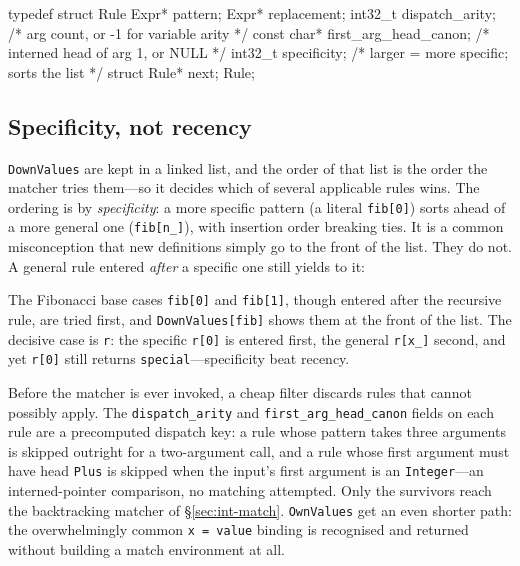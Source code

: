 \begin{ccode}
typedef struct Rule {
    Expr* pattern;
    Expr* replacement;
    int32_t     dispatch_arity;        /* arg count, or -1 for variable arity   */
    const char* first_arg_head_canon;  /* interned head of arg 1, or NULL        */
    int32_t     specificity;           /* larger = more specific; sorts the list */
    struct Rule* next;
} Rule;
\end{ccode}

\subsection*{Specificity, not recency}

\texttt{DownValues} are kept in a linked list, and the order of that list is the order
the matcher tries them---so it decides which of several applicable rules wins. The
ordering is by \emph{specificity}: a more specific pattern (a literal
\texttt{fib[0]}) sorts ahead of a more general one (\texttt{fib[n\_]}), with insertion
order breaking ties. It is a common misconception that new definitions simply go to
the front of the list. They do not. A general rule entered \emph{after} a specific one
still yields to it:


The Fibonacci base cases \texttt{fib[0]} and \texttt{fib[1]}, though entered after the
recursive rule, are tried first, and \texttt{DownValues[fib]} shows them at the front
of the list. The decisive case is \texttt{r}: the specific \texttt{r[0]} is entered
first, the general \texttt{r[x\_]} second, and yet \texttt{r[0]} still returns
\texttt{special}---specificity beat recency.


Before the matcher is ever invoked, a cheap filter discards rules that cannot possibly
apply. The \texttt{dispatch\_arity} and \texttt{first\_arg\_head\_canon} fields on each
rule are a precomputed dispatch key: a rule whose pattern takes three arguments is
skipped outright for a two-argument call, and a rule whose first argument must have
head \texttt{Plus} is skipped when the input's first argument is an
\texttt{Integer}---an interned-pointer comparison, no matching attempted. Only the
survivors reach the backtracking matcher of \S\ref{sec:int-match}.
\texttt{OwnValues} get an even shorter path: the overwhelmingly common
\texttt{x = value} binding is recognised and returned without building a match
environment at all.

